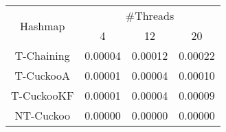 \begin{tabular}{|c|c|c|c|}
\hline
\multirow{2}{*}{Hashmap} & \multicolumn{3}{c|}{\#Threads}\\\cline{2-4}& 4 & 12 & 20\\
\hline
\hline
T-Chaining & 0.00004 & 0.00012 & 0.00022\\
T-CuckooA & 0.00001 & 0.00004 & 0.00010\\
T-CuckooKF & 0.00001 & 0.00004 & 0.00009\\
NT-Cuckoo & 0.00000 & 0.00000 & 0.00000\\
\hline
\end{tabular}
